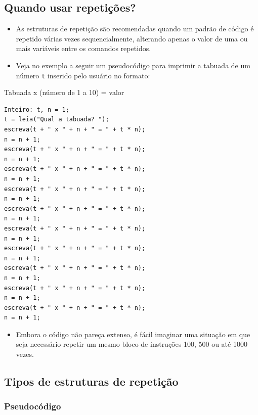 \documentclass[12pt,a4paper]{article}
\providecommand{\tightlist}{%
      \setlength{\itemsep}{0pt}\setlength{\parskip}{0pt}}
\begin{document}
    \hypertarget{quando-usar-repetiuxe7uxf5es}{%
\subsection{Quando usar
repetições?}\label{quando-usar-repetiuxe7uxf5es}}

    \begin{itemize}
\item
  As estruturas de repetição são recomendadas quando um padrão de código
  é repetido várias vezes sequencialmente, alterando apenas o valor de
  uma ou mais variáveis entre os comandos repetidos.
\item
  Veja no exemplo a seguir um pseudocódigo para imprimir a tabuada de um
  número \texttt{t} inserido pelo usuário no formato:
\end{itemize}

Tabuada x (número de 1 a 10) = valor

    \begin{verbatim}
Inteiro: t, n = 1;
t = leia("Qual a tabuada? ");
escreva(t + " x " + n + " = " + t * n);        
n = n + 1;
escreva(t + " x " + n + " = " + t * n);        
n = n + 1;
escreva(t + " x " + n + " = " + t * n);        
n = n + 1;
escreva(t + " x " + n + " = " + t * n);        
n = n + 1;
escreva(t + " x " + n + " = " + t * n);        
n = n + 1;
escreva(t + " x " + n + " = " + t * n);        
n = n + 1;
escreva(t + " x " + n + " = " + t * n);        
n = n + 1;
escreva(t + " x " + n + " = " + t * n);        
n = n + 1;
escreva(t + " x " + n + " = " + t * n);        
n = n + 1;
escreva(t + " x " + n + " = " + t * n);        
n = n + 1;
\end{verbatim}

    \begin{itemize}
\tightlist
\item
  Embora o código não pareça extenso, é fácil imaginar uma situação em
  que seja necessário repetir um mesmo bloco de instruções 100, 500 ou
  até 1000 vezes.
\end{itemize}

    \hypertarget{tipos-de-estruturas-de-repetiuxe7uxe3o}{%
\subsection{Tipos de estruturas de
repetição}\label{tipos-de-estruturas-de-repetiuxe7uxe3o}}

    \hypertarget{pseudocuxf3digo}{%
\subsubsection{Pseudocódigo}\label{pseudocuxf3digo}}
\end{document}
